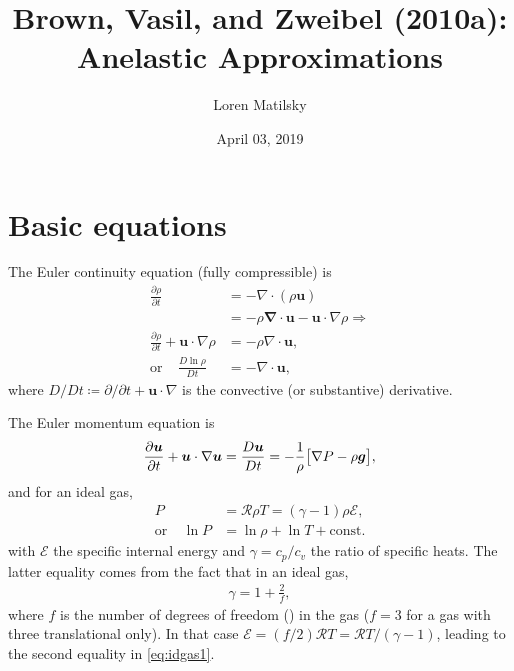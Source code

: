 \documentclass[12pt]{article} %
\date{April 03, 2019}
\author{Loren Matilsky}
\title{Brown, Vasil, and Zweibel (2010a): Anelastic Approximations}
\newcommand{\pderiv}[2]{\frac{\partial#1}{\partial#2}}
\begin{document}
	\maketitle
	\section{Basic equations}
	The Euler continuity equation (fully compressible) is
	\begin{subequations}\label{eq:cont}
		\begin{align}
		\pderiv{\rho}{t}&=-\nabla\cdot(\rho\bm{u})\label{eq:conta}\\
		&=-\rho\bm\nabla\cdot\bm{u} -\bm{u}\cdot\nabla\rho\Longrightarrow\nonumber\\
		\pderiv{\rho}{t} + \bm{u}\cdot\nabla\rho &= -\rho\nabla\cdot\bm{u},\label{eq:contb}\\
		\text{or}\ \ \ \ \ \frac{D\ln{\rho}}{Dt} &= -\nabla\cdot\bm{u},\label{eq:contc}
		\end{align}
	\end{subequations}
	where $D/Dt \coloneqq \partial/\partial t + \bm{u}\cdot\nabla$ is the convective (or substantive) derivative. 
	
	The Euler momentum equation is
	\begin{align}
	\pderiv{\bm{u}}{t} + \bm{u}\cdot\nabla\bm{u} = \frac{D\bm{u}}{Dt} = 
	 -\frac{1}{\rho}\big{[}\nabla P - \rho\bm{g}\big{]},
	 \label{eq:fc_mom}
	\end{align}
	and for an ideal gas,
	\begin{subequations}
	\begin{align}
	P &= \mathcal{R}\rho T = (\gamma - 1)\rho\mathcal{E},\label{eq:idgas1}\\
	\text{or}\ \ \ \ \ \ln{P} &= \ln{\rho} + \ln{T} + \text{const.}\label{eq:idgas2}
	\end{align}
	\end{subequations}
	with $\mathcal{E}$ the specific internal energy and $\gamma=c_p/c_v$ the ratio of specific heats. The latter equality comes from the fact that in an ideal gas,
	\begin{align}
	\gamma = 1 + \frac{2}{f}\nonumber,
	\end{align}
	where $f$ is the number of degrees of freedom () in the gas ($f=3$ for a gas with three translational  only). In that case $\mathcal{E}=(f/2)\mathcal{R} T=\mathcal{R} T/(\gamma - 1)$, leading to the second equality in \eqref{eq:idgas1}.
	
\end{document}
